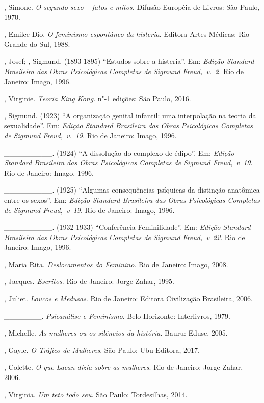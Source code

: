 \begin{Parskip}
, Simone. \emph{O segundo sexo -- fatos e mitos.} Difusão
Européia de Livros: São Paulo, 1970.

, Emilce Dio. \emph{O feminismo espontâneo da histeria}.
Editora Artes Médicas: Rio Grande do Sul, 1988.

, Josef; , Sigmund. (1893-1895) ``Estudos sobre a histeria''. Em:
\emph{Edição Standard Brasileira das Obras Psicológicas Completas de Sigmund
Freud,~v.~2}. Rio de Janeiro: Imago, 1996.

, Virginie. \emph{Teoria King Kong}. n"-1 edições: São Paulo, 2016.

, Sigmund. (1923) ``A organização genital infantil: uma interpolação
na teoria da sexualidade''. Em: \emph{Edição Standard Brasileira das Obras
Psicológicas Completas de Sigmund Freud,~v.~19}. Rio de Janeiro: Imago, 1996.

\_\_\_\_\_\_\_\_\_. (1924) ``A dissolução do complexo de édipo''. Em:
\emph{Edição Standard Brasileira das Obras Psicológicas Completas de Sigmund
Freud,~v~19}. Rio de Janeiro: Imago, 1996.

\_\_\_\_\_\_\_\_\_. (1925) ``Algumas consequências psíquicas da
distinção anatômica entre os sexos''. Em: \emph{Edição Standard Brasileira das
Obras Psicológicas Completas de Sigmund Freud,~v~19}. Rio de Janeiro: Imago, 1996.

\_\_\_\_\_\_\_\_\_. (1932-1933) ``Conferência  Feminilidade''.
Em: \emph{Edição Standard Brasileira das Obras Psicológicas Completas de
Sigmund Freud,~v~22}. Rio de Janeiro: Imago, 1996.

, Maria Rita. \emph{Deslocamentos do Feminino}. Rio de Janeiro: Imago, 2008.

, Jacques. \emph{Escritos}. Rio de Janeiro: Jorge Zahar, 1995.

, Juliet. \emph{Loucos e Medusas}. Rio de Janeiro: Editora Civilização
Brasileira, 2006.

\_\_\_\_\_\_\_. \emph{Psicanálise e Feminismo}. Belo Horizonte: Interlivros, 1979.

, Michelle. \emph{As mulheres ou os silêncios da história}. Bauru:
Edusc, 2005.

, Gayle. \emph{O Tráfico de Mulheres}. São Paulo: Ubu Editora, 2017.

, Colette. \emph{O que Lacan dizia sobre as mulheres}. Rio de Janeiro: Jorge Zahar, 2006.

, Virginia. \emph{Um teto todo seu}. São Paulo: Tordesilhas, 2014.
\end{Parskip}

